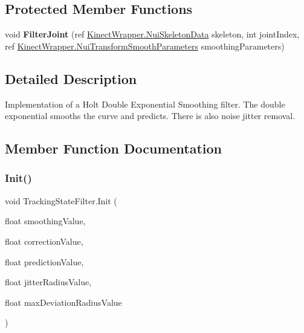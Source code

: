 \subsection*{Protected Member Functions}
\begin{DoxyCompactItemize}
\item 
\mbox{\label{class_tracking_state_filter_a1893e102dd433941dc3dcd844f932ae4}} 
void {\bfseries Filter\+Joint} (ref \mbox{\hyperlink{struct_kinect_wrapper_1_1_nui_skeleton_data}{Kinect\+Wrapper.\+Nui\+Skeleton\+Data}} skeleton, int joint\+Index, ref \mbox{\hyperlink{struct_kinect_wrapper_1_1_nui_transform_smooth_parameters}{Kinect\+Wrapper.\+Nui\+Transform\+Smooth\+Parameters}} smoothing\+Parameters)
\end{DoxyCompactItemize}


\subsection{Detailed Description}
Implementation of a Holt Double Exponential Smoothing filter. The double exponential smooths the curve and predicts. There is also noise jitter removal. 



\subsection{Member Function Documentation}
\mbox{\label{class_tracking_state_filter_a04be8b493efd27ca4e283194b0c88345}} 
\subsubsection{\texorpdfstring{Init()}{Init()}}
{\footnotesize\ttfamily void Tracking\+State\+Filter.\+Init (\begin{DoxyParamCaption}\item[{float}]{smoothing\+Value,  }\item[{float}]{correction\+Value,  }\item[{float}]{prediction\+Value,  }\item[{float}]{jitter\+Radius\+Value,  }\item[{float}]{max\+Deviation\+Radius\+Value }\end{DoxyParamCaption})}



